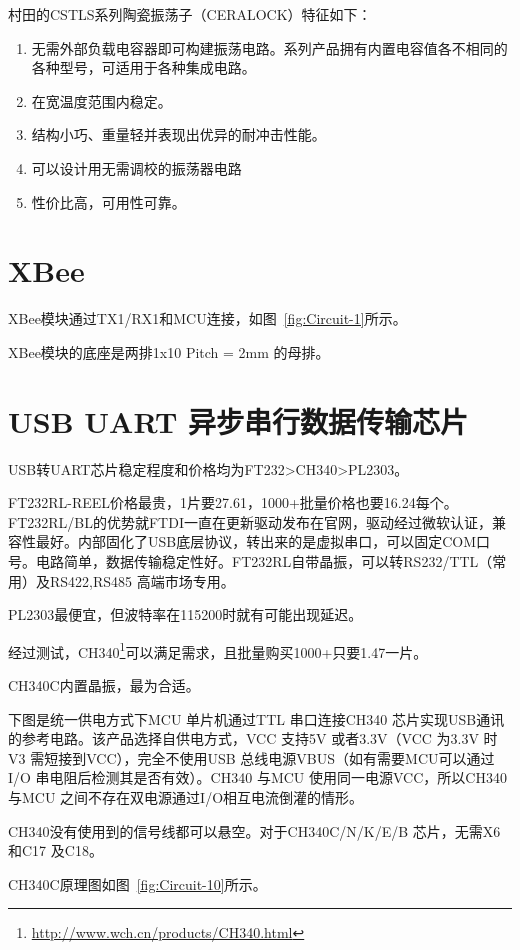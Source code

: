 村田的CSTLS系列陶瓷振荡子（CERALOCK）特征如下：

\begin{enumerate}
    \item 无需外部负载电容器即可构建振荡电路。系列产品拥有内置电容值各不相同的各种型号，可适用于各种集成电路。
    \item 在宽温度范围内稳定。
    \item 结构小巧、重量轻并表现出优异的耐冲击性能。
    \item 可以设计用无需调校的振荡器电路
    \item 性价比高，可用性可靠。
\end{enumerate}

\section{XBee}

XBee模块通过TX1/RX1和MCU连接，如图~\ref{fig:Circuit-1}所示。

XBee模块的底座是两排1x10 Pitch = 2mm 的母排。

\section{USB UART 异步串行数据传输芯片}

USB转UART芯片稳定程度和价格均为FT232>CH340>PL2303。

FT232RL-REEL价格最贵，1片要27.61，1000+批量价格也要16.24每个。FT232RL/BL的优势就FTDI一直在更新驱动发布在官网，驱动经过微软认证，兼容性最好。内部固化了USB底层协议，转出来的是虚拟串口，可以固定COM口号。电路简单，数据传输稳定性好。FT232RL自带晶振，可以转RS232/TTL（常用）及RS422,RS485 高端市场专用。

PL2303最便宜，但波特率在115200时就有可能出现延迟。

经过测试，CH340\footnote{\url{http://www.wch.cn/products/CH340.html}}可以满足需求，且批量购买1000+只要1.47一片。

CH340C内置晶振，最为合适。

下图是统一供电方式下MCU 单片机通过TTL 串口连接CH340 芯片实现USB通讯的参考电路。该产品选择自供电方式，VCC 支持5V 或者3.3V（VCC 为3.3V 时V3 需短接到VCC），完全不使用USB 总线电源VBUS（如有需要MCU可以通过I/O 串电阻后检测其是否有效）。CH340 与MCU 使用同一电源VCC，所以CH340与MCU 之间不存在双电源通过I/O相互电流倒灌的情形。

CH340没有使用到的信号线都可以悬空。对于CH340C/N/K/E/B 芯片，无需X6 和C17 及C18。

CH340C原理图如图~\ref{fig:Circuit-10}所示。

